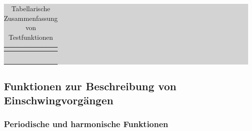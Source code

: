 \begin{table}[H]
\setlength{\arrayrulewidth}{.1em}
\caption{Tabellarische Zusammenfassung von Testfunktionen}
\setlength{\fboxsep}{0pt}%
\colorbox{lightgray}{%
%
\begin{tabular}{| l | l |}
\hline
\parbox[c][0.28in][c]{3.3in}{\smallskip\centering\textbf{\selectfont{Testfunktion}}} & \parbox[c][0.28in][c]{3.3in}{\smallskip\centering\textbf{\selectfont{Mathematische Beschreibung}}}\\ \hline

\parbox[c][0.64in][c]{3.3in}{} & 
\parbox[c][0.64in][c]{3.3in}{}\\ \hline

\parbox[c][0.64in][c]{3.3in}{} & \parbox[c][0.64in][c]{3.3in}{}\\ \hline

\parbox[c][0.64in][c]{3.3in}{} & 
\parbox[c][0.64in][c]{3.3in}{}\\ \hline

\parbox[c][0.64in][c]{3.3in}{} & 
\parbox[c][0.64in][c]{3.3in}{}\\ \hline

\parbox[c][0.64in][c]{3.3in}{} &
\parbox[c][0.64in][c]{3.3in}{}\\ \hline

\end{tabular}%
}
\label{tab:twofour}
\end{table}

\clearpage 


\subsection{ Funktionen zur Beschreibung von Einschwingvorg\"{a}ngen}


\subsubsection{ Periodische und harmonische Funktionen}

